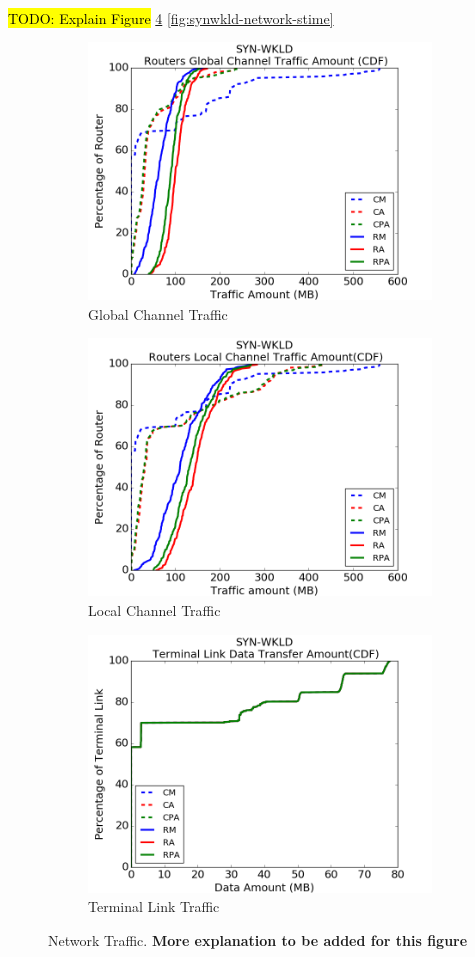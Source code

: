 \documentclass[conference,compsoc]{IEEEtran}
\newcommand{\TODO}[1]{\hl{TODO: #1}}
\begin{document}
\\ \TODO{Explain Figure }  \ref{fig:synwkld-network-traffic} \ref{fig:synwkld-network-stime} 


\begin{figure}[t!]
    \centering
    \begin{subfigure}[t]{0.32\textwidth}
        \centering
        \includegraphics[height=1.8 in]{syn-wkld/gc-traffic}
        \caption{Global Channel Traffic}
        \label{fig:synwkld-global-channel-traffic}
    \end{subfigure}%
    \hspace{1em}%
    \begin{subfigure}[t]{0.32\textwidth}
        \centering
        \includegraphics[height=1.8 in]{syn-wkld/lc-traffic}
        \caption{Local Channel Traffic}
        \label{fig:synwkld-local-channel-traffic}
    \end{subfigure}%
    \hspace{1em}%
    \begin{subfigure}[t]{0.32\textwidth}
        \centering
        \includegraphics[height=1.8 in]{syn-wkld/tl-traffic}
        \caption{Terminal Link Traffic}
        \label{fig:synwkld-terminal-link-traffic}
    \end{subfigure}%
  \caption{Network Traffic. \textbf{More explanation to be added for this figure}}
   \label{fig:synwkld-network-traffic}
\end{figure}
\end{document}
